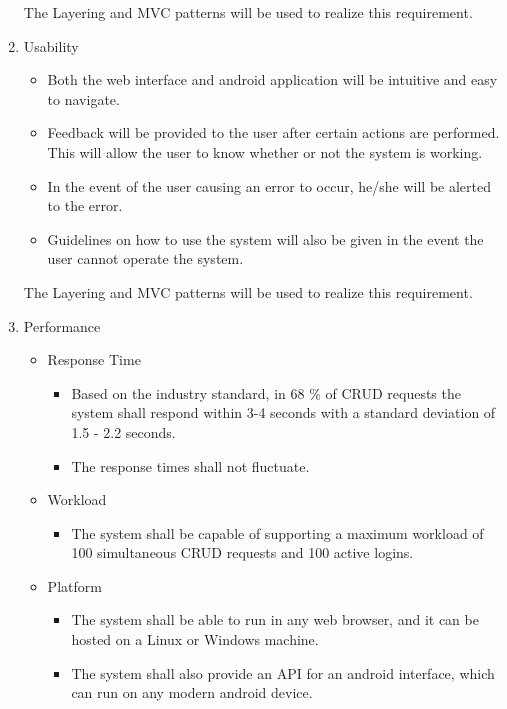 \documentclass{article}
\begin{document}
\begin{enumerate}
		The Layering and MVC patterns will be used to realize this requirement.
		
		\item{Usability}
		\begin{itemize}
			\item{Both the web interface and android application will be intuitive and easy to navigate.}
			\item{Feedback will be provided to the user after certain actions are performed. This will allow the user to know whether or not the system is working.}
			\item{In the event of the user causing an error to occur, he/she will be alerted to the error.}
			\item{Guidelines on how to use the system will also be given in the event the user cannot operate the system.}
		\end{itemize}
		
		The Layering and MVC patterns will be used to realize this requirement.

		\item{Performance}
		\begin{itemize}
		 \item Response Time
		 		\begin{itemize}
		 			\item Based on the industry standard, in 68 \% of CRUD requests the system shall respond within 3-4 seconds with a standard deviation of 1.5 - 2.2 seconds.  			
		 			\item The response times shall not fluctuate.
				\end{itemize}
		 \item Workload
		 		\begin{itemize}
		 			\item The system shall be capable of supporting a maximum workload of 100 simultaneous CRUD requests and 100 active logins.   		
				\end{itemize}
		 \item Platform
		 		\begin{itemize}
		 			\item The system shall be able to run in any web browser, and it can be hosted on a Linux or Windows machine.   			
		 			\item The system shall also provide an API for an android interface, which can run on any modern android device.
				\end{itemize}
		\end{itemize}
		

\end{enumerate}
\end{document}
